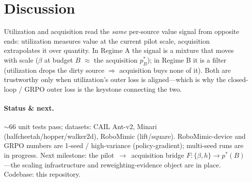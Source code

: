 \documentclass[11pt]{article}
\begin{document}
\section{Discussion}
Utilization and acquisition read the \emph{same} per-source value signal from opposite ends:
utilization measures value at the current pilot scale, acquisition extrapolates it over quantity.
In Regime A the signal is a mixture that moves with scale ($\beta$ at budget $B$ $\approx$ the
acquisition $p^\ast_B$); in Regime B it is a filter (utilization drops the dirty source
$\Rightarrow$ acquisition buys none of it). Both are trustworthy only when utilization's outer loss
is aligned---which is why the closed-loop / GRPO outer loss is the keystone connecting the two.

\paragraph{Status \& next.} $\sim$66 unit tests pass; datasets: CAIL Ant-v2, Minari
(halfcheetah/hopper/walker2d), RoboMimic (lift/square). RoboMimic-device and GRPO numbers are
1-seed / high-variance (policy-gradient); multi-seed runs are in progress. Next milestone: the
pilot~$\to$~acquisition bridge $F:\{\beta,h\}\!\to\!p^\ast(B)$---the scaling infrastructure
and reweighting-evidence object are in place. Codebase: this repository.
\end{document}
